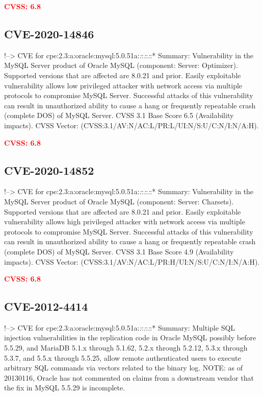 \documentclass[a4paper, 12pt]{article}
\begin{document}
\textbf{\textcolor{red}{CVSS: 6.8}}

\hypertarget{cve-2020-14846}{%
\subsection{CVE-2020-14846}\label{cve-2020-14846}}

!--\textgreater{} CVE for
cpe:2.3:a:oracle:mysql:5.0.51a:\emph{:}:\emph{:}:\emph{:}:* Summary:
Vulnerability in the MySQL Server product of Oracle MySQL (component:
Server: Optimizer). Supported versions that are affected are 8.0.21 and
prior. Easily exploitable vulnerability allows low privileged attacker
with network access via multiple protocols to compromise MySQL Server.
Successful attacks of this vulnerability can result in unauthorized
ability to cause a hang or frequently repeatable crash (complete DOS) of
MySQL Server. CVSS 3.1 Base Score 6.5 (Availability impacts). CVSS
Vector: (CVSS:3.1/AV:N/AC:L/PR:L/UI:N/S:U/C:N/I:N/A:H).

\textbf{\textcolor{red}{CVSS: 6.8}}

\hypertarget{cve-2020-14852}{%
\subsection{CVE-2020-14852}\label{cve-2020-14852}}

!--\textgreater{} CVE for
cpe:2.3:a:oracle:mysql:5.0.51a:\emph{:}:\emph{:}:\emph{:}:* Summary:
Vulnerability in the MySQL Server product of Oracle MySQL (component:
Server: Charsets). Supported versions that are affected are 8.0.21 and
prior. Easily exploitable vulnerability allows high privileged attacker
with network access via multiple protocols to compromise MySQL Server.
Successful attacks of this vulnerability can result in unauthorized
ability to cause a hang or frequently repeatable crash (complete DOS) of
MySQL Server. CVSS 3.1 Base Score 4.9 (Availability impacts). CVSS
Vector: (CVSS:3.1/AV:N/AC:L/PR:H/UI:N/S:U/C:N/I:N/A:H).

\textbf{\textcolor{red}{CVSS: 6.8}}

\hypertarget{cve-2012-4414}{%
\subsection{CVE-2012-4414}\label{cve-2012-4414}}

!--\textgreater{} CVE for
cpe:2.3:a:oracle:mysql:5.0.51a:\emph{:}:\emph{:}:\emph{:}:* Summary:
Multiple SQL injection vulnerabilities in the replication code in Oracle
MySQL possibly before 5.5.29, and MariaDB 5.1.x through 5.1.62, 5.2.x
through 5.2.12, 5.3.x through 5.3.7, and 5.5.x through 5.5.25, allow
remote authenticated users to execute arbitrary SQL commands via vectors
related to the binary log. NOTE: as of 20130116, Oracle has not
commented on claims from a downstream vendor that the fix in MySQL
5.5.29 is incomplete.
\end{document}
